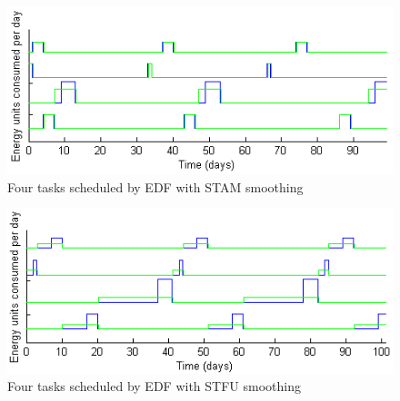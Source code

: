 \begin{figure}[htb]
\includegraphics[scale=0.72]{stamtasks.png}
\caption{Four tasks scheduled by EDF with STAM smoothing}
\label{fig:stamtaskplot}
\end{figure}


\begin{figure}[htb]
\includegraphics[scale=0.72]{stfutasks.png}
\caption{Four tasks scheduled by EDF with STFU smoothing}
\label{fig:stfutaskplot}
\end{figure}



































